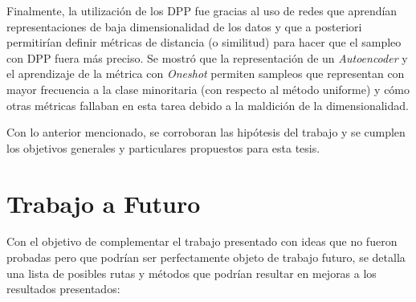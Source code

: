 Finalmente, la utilización de los DPP fue gracias al uso de redes que aprendían representaciones de baja dimensionalidad de los datos y que a posteriori permitirían definir métricas de distancia (o similitud) para hacer que el sampleo con DPP fuera más preciso. Se mostró que la representación de un \textit{Autoencoder} y el aprendizaje de la métrica con \textit{Oneshot} permiten sampleos que representan con mayor frecuencia a la clase minoritaria (con respecto al método uniforme) y cómo otras métricas fallaban en esta tarea debido a la maldición de la dimensionalidad. 

\vspace{0.2cm}

Con lo anterior mencionado, se corroboran las hipótesis del trabajo y se cumplen los objetivos generales y particulares propuestos para esta tesis. 

\section{Trabajo a Futuro}

Con el objetivo de complementar el trabajo presentado con ideas que no fueron probadas pero que podrían ser perfectamente objeto de trabajo futuro, se detalla una lista de posibles rutas y métodos que podrían resultar en mejoras a los resultados presentados:

